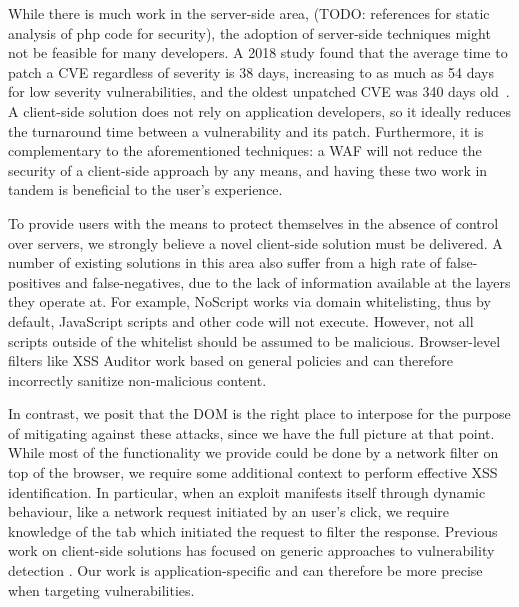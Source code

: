 While there is much work in the server-side area,
\cite{Xu:2006:TPE:1267336.1267345,DBLP:conf/sec/Nguyen-TuongGGSE05,Pietraszek:2005:DAI:2146257.2146267,Bisht:2008:XPD:1428322.1428325}
(TODO: references for static analysis of php code for security), the
adoption of server-side techniques might not be feasible for many
developers. A 2018 study found that the average time to patch a \ac{CVE}
regardless of severity is 38 days, increasing to as much as 54 days
for low severity vulnerabilities, and the oldest unpatched \ac{CVE} was 340
days old~\cite{Rapid7}. A client-side solution does not rely on
application developers, so it ideally reduces the turnaround time
between a vulnerability and its patch. Furthermore, it is
complementary to the aforementioned techniques: a \ac{WAF} will not reduce
the security of a client-side approach by any means, and having these
two work in tandem is beneficial to the user's experience.

To provide users with the means to protect themselves in the absence
of control over servers, we strongly believe a novel client-side
solution must be delivered. A number of existing solutions in this
area also suffer from a high rate of false-positives and
false-negatives, due to the lack of information available at the
layers they operate at. For example, NoScript \cite{Noscript} works via domain
whitelisting, thus by default, JavaScript scripts and other code will
not execute. However, not all scripts outside of the whitelist should
be assumed to be malicious. Browser-level filters like XSS Auditor
work based on general policies and can therefore incorrectly sanitize
non-malicious content.

In contrast, we posit that the DOM is the right place to interpose for
the purpose of mitigating against these attacks, since we have the
full picture at that point. While most of the functionality we provide
could be done by a network filter on top of the browser, we require
some additional context to perform effective \ac{XSS} identification. In
particular, when an exploit manifests itself through dynamic
behaviour, like a network request initiated by an user's click, we
require knowledge of the tab which initiated the request to filter the
response. Previous work on client-side solutions has focused on
generic approaches to vulnerability detection
\cite{Kirda:2009:CCS:2639535.2639808,Jim:2007:DSI:1242572.1242654,Hallaraker:2005:DMJ:1078029.1078861}. Our
work is application-specific and can therefore be more precise when
targeting vulnerabilities.

